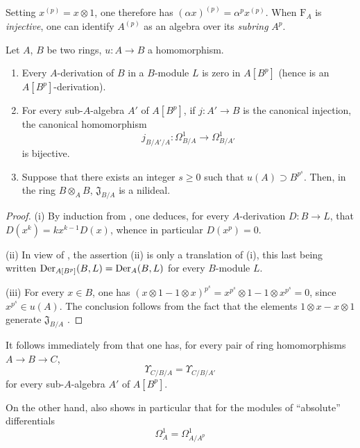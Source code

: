 Setting $x^{(p)}=x\otimes 1$, one therefore has $(\alpha x)^{(p)}=\alpha^p x^{(p)}$.
When $\mathrm{F}_A$ is \emph{injective}, one can identify $A^{(p)}$ as an algebra over its \emph{subring} $A^p$.

\begin{proposition}[21.1.5]
\label{0.21.1.5}
Let $A$, $B$ be two rings, $u:A\to B$ a homomorphism.
\begin{enumerate}
  \item[\rm(i)] Every $A$-derivation of $B$ in a $B$-module $L$ is zero in $A[B^p]$ \textup{(}hence is an $A[B^p]$-derivation\textup{)}.
  \item[\rm(ii)] For every sub-$A$-algebra $A'$ of $A[B^p]$, if $j:A'\to B$ is the canonical injection, the canonical homomorphism
\[
  j_{B/A'/A}:\Omega^1_{B/A}\to\Omega^1_{B/A'}
\]
is bijective.
  \item[\rm(iii)] Suppose that there exists an integer $s\geq 0$ such that $u(A)\supset B^{p^s}$.
  Then, in the ring $B\otimes_A B$, $\mathfrak{J}_{B/A}$ is a nilideal.
\end{enumerate}
\end{proposition}

\begin{proof}
(i) By induction from , one deduces, for every $A$-derivation $D:B\to L$, that $D(x^k)=kx^{k-1}D(x)$, whence in particular $D(x^p)=0$.

(ii) In view of , the assertion (ii) is only a translation of (i), this last being written $\operatorname{Der}_{A[B^p]}(B,L)=\operatorname{Der}_A(B,L)$ for every $B$-module $L$.

(iii) For every $x\in B$, one has $(x\otimes 1-1\otimes x)^{p^s}=x^{p^s}\otimes 1-1\otimes x^{p^s}=0$, since $x^{p^s}\in u(A)$.
The conclusion follows from the fact that the elements $1\otimes x-x\otimes 1$ generate $\mathfrak{J}_{B/A}$ .
\end{proof}

It follows immediately from  that one has, for every pair of ring homomorphisms $A\to B\to C$,
\begin{equation}
\tag{21.1.5.1}
  \label{0.21.1.5.1}
  \Upsilon_{C/B/A}=\Upsilon_{C/B/A'}
\end{equation}
for every sub-$A$-algebra $A'$ of $A[B^p]$.

On the other hand,  also shows in particular that for the modules of ``absolute'' differentials
\begin{equation}
\tag{21.1.5.2}
  \label{0.21.1.5.2}
  \Omega^1_A=\Omega^1_{A/A^p}
\end{equation}

